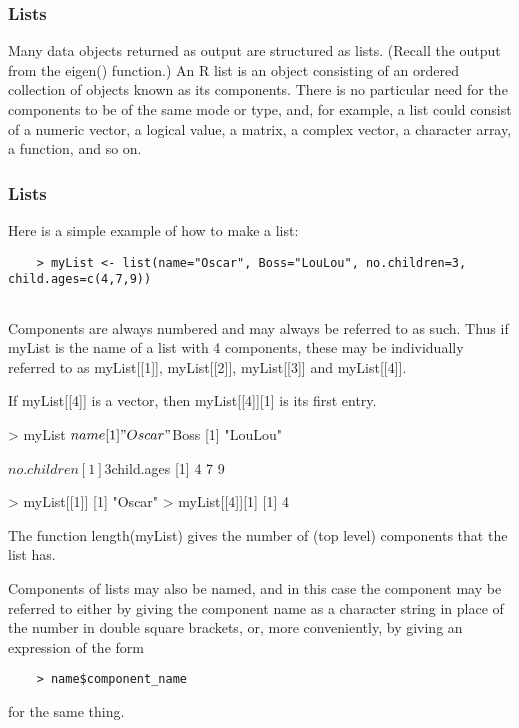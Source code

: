 
\begin{frame}[fragile]
	\frametitle{ Lists }
	Many data objects returned as output are structured as lists. 
	(Recall the output from the eigen() function.)
	An  R list is an object consisting of an ordered collection of objects known as its components. 
	There is no particular need for the components to be of the same mode or type, and, for example, a list could consist of a numeric vector, a logical value, a matrix, a complex vector, a character array, a function, and so on.
	
\end{frame}
\begin{frame}[fragile]
	\frametitle{ Lists }
	Here is a simple example of how to make a list: 
	\begin{verbatim}
	> myList <- list(name="Oscar", Boss="LouLou", no.children=3,                   child.ages=c(4,7,9))
	
	\end{verbatim}     
	Components are always numbered and may always be referred to as such. 
	Thus if myList is the name of a list with 4 components, these may be individually referred to as myList[[1]], myList[[2]], myList[[3]] and myList[[4]]. 
\end{frame}
\begin{frame}[fragile]
	If myList[[4]] is a vector, then myList[[4]][1] is its first entry. 
	
	> myList
	$name
	[1] "Oscar"
	
	$Boss
	[1] "LouLou"
	
	$no.children
	[1] 3
	
	$child.ages
	[1] 4 7 9
\end{frame}
\begin{frame}[fragile]
	> myList[[1]]
	[1] "Oscar"
	> myList[[4]][1]
	[1] 4
\end{frame}
\begin{frame}[fragile]
	
	The function length(myList) gives the number of (top level) components that the list has. 
	
	Components of lists may also be named, and in this case the component may be referred to either by giving the component name as a character string in place of the number in double square brackets, or, more conveniently, by giving an expression of the form 
	
	\begin{verbatim}
	> name$component_name
	\end{verbatim}
	
	for the same thing. 
\end{frame}
